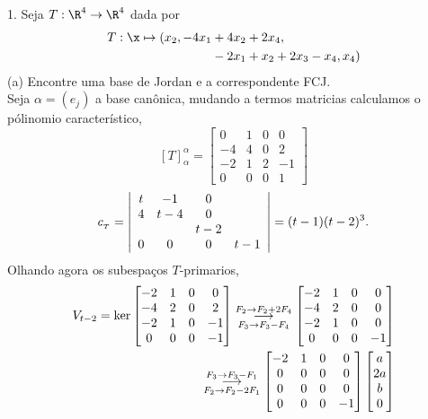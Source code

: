1. Seja \(T: \R^4 \to \R^4\) dada por 
\begin{align*}
    T: \x \mapsto (x_2, -4x_1 &+ 4 x_2 + 2 x_4, \\ 
    &-2x_1 +x_2 + 2x_3 - x_4, x_4)
\end{align*}
(a) Encontre uma base de Jordan e a correspondente FCJ. \\ 
\textcolor{gris}{Seja \(\alpha = (e_j)\) a base canônica, mudando a termos matricias calculamos o pólinomio característico,
{\small \[[T]_\alpha^\alpha = \begin{bmatrix}
0 & 1 & 0 & 0 \\ 
-4 & 4 & 0 & 2 \\ 
-2 & 1 & 2 & -1 \\ 
0 & 0 & 0 & 1  
\end{bmatrix}\]  }
{\small \[
\text{\normalsize $c_{_T}$} = \left|\begin{array}{c c c c}
t & -1 & 0 &  \\ 
4 &t-4 & 0 &  \\ 
 &  &t-2 &  \\ 
0 & 0 & 0 & t-1  
\end{array}\right|= (t-1)(t-2)^3 .
\]}
Olhando agora os subespaços \(T\)-primarios, 
{\small \begin{align*}\text{\normalsize $V_{t-2}$} = \ker\begin{bmatrix}
-2 & 1 & 0 & 0 \\ 
-4 & 2 & 0 & 2 \\ 
-2 & 1 & 0 & -1 \\ 
0 & 0 & 0 & -1   
\end{bmatrix} \overset{F_2 \to F_2 + 2F_4}{\underset{F_3 \to F_3-F_4}{\longrightarrow}} \begin{bmatrix}
-2 & 1 & 0 & 0 \\ 
-4 & 2 & 0 & 0 \\ 
-2 & 1 & 0 & 0 \\ 
0 & 0 & 0 & -1   
\end{bmatrix} \\ 
\overset{F_3 \to F_3 - F_1}{\underset{F_2 \to F_2 - 2F_1}{\longrightarrow}}
\begin{bmatrix}
-2 & 1 & 0 & 0 \\ 
0 & 0 & 0 & 0 \\ 
0 & 0 & 0 & 0 \\ 
0 & 0 & 0 & -1
\end{bmatrix}\begin{bmatrix}
    a \\ 2a \\ b \\ 0

\end{bmatrix}
\end{align*}}}
